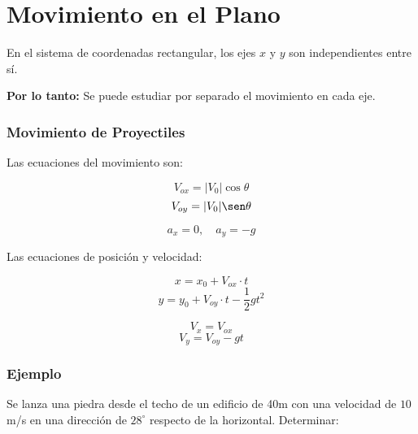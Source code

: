 \chapter{Movimiento en el Plano}

En el sistema de coordenadas rectangular, los ejes $x$ y $y$ son independientes entre sí. 

\textbf{Por lo tanto:} Se puede estudiar por separado el movimiento en cada eje.

\subsection*{Movimiento de Proyectiles}

\begin{center}
\end{center}

Las ecuaciones del movimiento son:

\[
V_{ox} = |V_0| \cos\theta
\]
\[
V_{oy} = |V_0| \sen\theta
\]

\[
a_x = 0, \quad a_y = -g
\]

Las ecuaciones de posición y velocidad:

\[
x = x_0 + V_{ox} \cdot t
\]
\[
y = y_0 + V_{oy} \cdot t - \frac{1}{2} g t^2
\]

\[
V_x = V_{ox}
\]
\[
V_y = V_{oy} - g t
\]

\subsection*{Ejemplo}

Se lanza una piedra desde el techo de un edificio de 40m con una velocidad de $10$ m/s en una dirección de $28^\circ$ respecto de la horizontal. Determinar:


